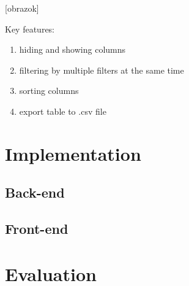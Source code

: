 [obrazok]

Key features:
\begin{enumerate}
\item hiding and showing columns
\item filtering by multiple filters at the same time
\item sorting columns
\item export table to .csv file
\end{enumerate}


\chapter{Implementation}

\section{Back-end}

\section{Front-end}


\chapter{Evaluation}



